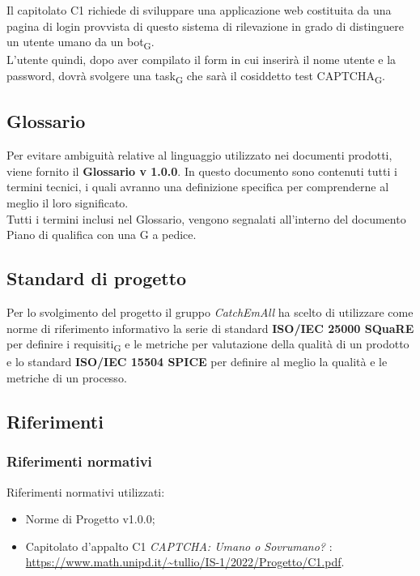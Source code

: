 Il capitolato C1 richiede di sviluppare una applicazione web costituita da una pagina di login provvista di questo sistema di rilevazione in grado di distinguere un utente umano da un bot\textsubscript{G}.\\
L'utente quindi, dopo aver compilato il form in cui inserirà il nome utente e la password, dovrà svolgere una task\textsubscript{G} che sarà il cosiddetto test CAPTCHA\textsubscript{G}.



\subsection{Glossario}
Per evitare ambiguità relative al linguaggio utilizzato nei documenti prodotti, viene fornito il \textbf{Glossario v 1.0.0}. In questo documento sono contenuti tutti i termini tecnici, i quali avranno una definizione specifica per comprenderne al meglio il loro significato.\\
Tutti i termini inclusi nel Glossario, vengono segnalati all'interno del documento Piano di qualifica con una G a pedice.


\subsection{Standard di progetto}
Per lo svolgimento del progetto il gruppo \textit{CatchEmAll} ha scelto di utilizzare come norme di riferimento informativo la serie di standard \textbf{ISO/IEC 25000 SQuaRE} per definire i requisiti\textsubscript{G} e le metriche per valutazione della qualità di un prodotto e lo standard \textbf{ISO/IEC 15504 SPICE} per definire al meglio la qualità e le metriche di un processo.

\subsection{Riferimenti}
\subsubsection{Riferimenti normativi}
Riferimenti normativi utilizzati:
\begin{itemize}
	\item Norme di Progetto v1.0.0;
	\item Capitolato d'appalto C1 \textit{CAPTCHA: Umano o Sovrumano?} : \\
		\url{https://www.math.unipd.it/~tullio/IS-1/2022/Progetto/C1.pdf}.
\end{itemize}
